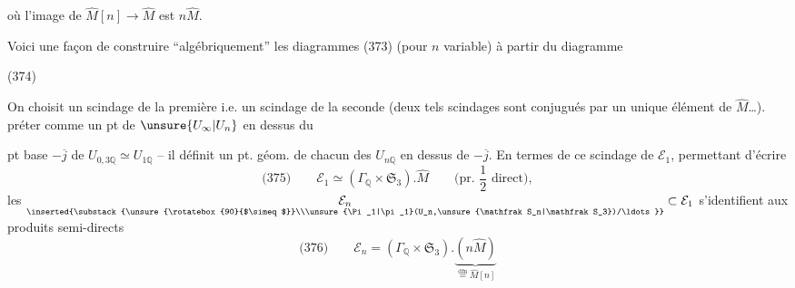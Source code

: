 où l'image de $\widehat M[n]\longrightarrow\widehat M$ est $n\widehat M$.

Voici  une façon de construire ``algébriquement'' les diagrammes (373) (pour $n$ variable) à partir du diagramme

\noindent (374)

On choisit un  scindage de la première i.e. un scindage de la seconde (deux tels scindages sont conjugués par un unique élément de $\widehat M$\ldots).
 préter comme un pt  de $\unsure{U_\infty|U_n}$ en dessus du

pt base $-\overline j$ de $U_{0,3\mathbb Q}\simeq U_{1\mathbb Q}$ -- il définit un pt. géom. de chacun des $U_{n\mathbb Q}$ en dessus de $-\overline j$. En termes de ce scindage de $\mathcal E_1$, permettant d'écrire
\[
\text{(375)}\qquad \mathcal E_1\simeq(\Gamma_{\mathbb Q}\times\mathfrak S_3).\widehat M
\qquad\text{(pr. $\frac12$ direct)},
\]
les $\underset{\inserted{\substack{\unsure{\rotatebox{90}{$\simeq$}}\\\unsure{\Pi_1|\pi_1}(U_n,\unsure{\mathfrak S_n|\mathfrak S_3})/\ldots}}}{\mathcal E_n}\subset\mathcal E_1$ s'identifient aux produits semi-directs
\[
\text{(376)}\qquad \mathcal E_n=(\Gamma_{\mathbb Q}\times\mathfrak S_3).
\underbrace{(n\widehat M)}_{\overset{\text{dfn}}{=}\widehat M[n]}
\]

